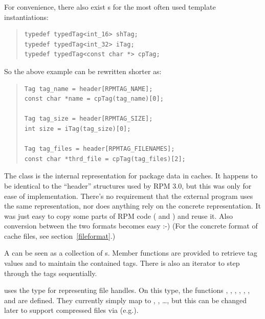 \documentclass[10pt]{article}
\begin{document}
For convenience, there also exist s for the most
often used template instantiations:
\begin{quote}
\begin{verbatim}
typedef typedTag<int_16> shTag;
typedef typedTag<int_32> iTag;
typedef typedTag<const char *> cpTag;
\end{verbatim}
\end{quote}
So the above example can be rewritten shorter as:
\begin{quote}
\begin{verbatim}
Tag tag_name = header[RPMTAG_NAME];
const char *name = cpTag(tag_name)[0];

Tag tag_size = header[RPMTAG_SIZE];
int size = iTag(tag_size)[0];

Tag tag_files = header[RPMTAG_FILENAMES];
const char *thrd_file = cpTag(tag_files)[2];
\end{verbatim}
\end{quote}



\label{pkgdb-dbheader}

The  class is the internal representation for package
data in caches. It happens to be identical to the ``header''
structures used by RPM 3.0, but this was only for ease of
implementation. There's no requirement that the external 
program uses the same representation, nor does anything rely on the
concrete representation. It was just easy to copy some parts of RPM
code ( and
) and reuse it. Also conversion between
the two formats becomes easy :-) (For the concrete format of cache
files, see section~\ref{fileformat}.)

A  can be seen as a collection of s. Member
functions are provided to retrieve tag values and to maintain the
contained tags. There is also an iterator 
to step through the tags sequentially.

 uses the type  for representing file
handles. On this type, the functions , ,
, , , , and
 are defined. They currently simply map to
, , \dots, but this can be changed later to
support compressed files via  (e.g.).
\end{document}
